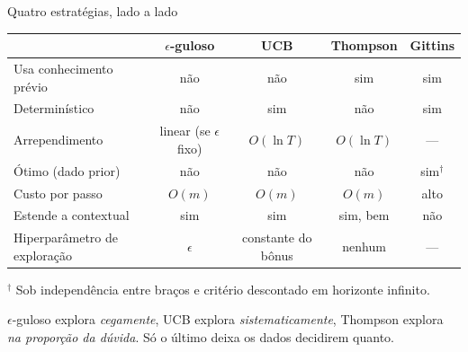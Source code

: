 \documentclass[aspectratio=169, 11pt]{beamer}
\begin{document}
\begin{frame}{Quatro estratégias, lado a lado}
  \begin{center}\small
  \begin{tabular}{@{}lcccc@{}}
    \toprule
     & \textbf{$\epsilon$-guloso} & \textbf{UCB} & \textbf{Thompson} & \textbf{Gittins} \\
    \midrule
    Usa conhecimento prévio       & não & não & \alert{sim} & \alert{sim} \\
    Determinístico                & não & \alert{sim} & não & \alert{sim} \\
    Arrependimento                & linear (se $\epsilon$ fixo) & $O(\ln T)$ & $O(\ln T)$ & --- \\
    Ótimo (dado prior)            & não & não & não & \alert{sim}$^{\dagger}$ \\
    Custo por passo               & $O(m)$ & $O(m)$ & $O(m)$ & alto \\
    Estende a contextual          & sim & sim & \alert{sim, bem} & não \\
    Hiperparâmetro de exploração  & $\epsilon$ & constante do bônus & \alert{nenhum} & --- \\
    \bottomrule
  \end{tabular}
  \end{center}

  \smallskip
  {\footnotesize $^{\dagger}$ Sob independência entre braços e critério
  descontado em horizonte infinito.}

  \begin{ideiabox}
    $\epsilon$-guloso explora \emph{cegamente}, UCB explora
    \emph{sistematicamente}, Thompson explora \emph{na proporção da
    dúvida}. Só o último deixa os dados decidirem quanto.
  \end{ideiabox}
\end{frame}
\end{document}
